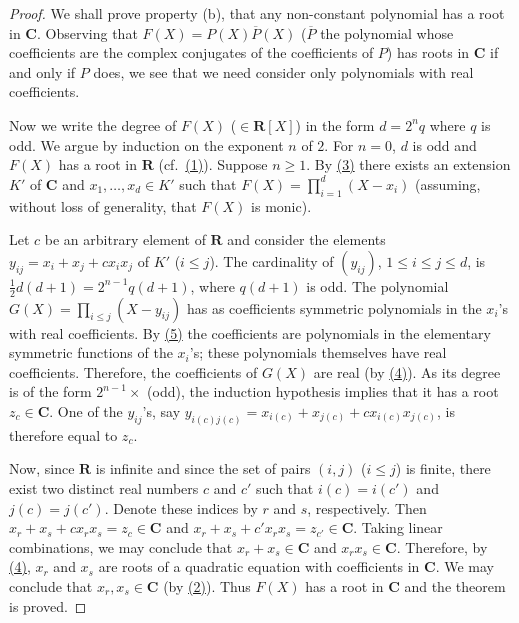 \begin{proof}
We shall prove property (b), that any non-constant polynomial has a root in
$\mathbf{C}$. Observing that
$F(X)=P(X)\overline{P}(X)$ ($\overline{P}$ the polynomial whose
coefficients are the complex conjugates of the coefficients of $P$) has
roots in $\mathbf{C}$ if and only if $P$ does, we see that we need consider
only polynomials with real coefficients.

Now we write the degree of $F(X)$ ($\in\mathbf{R}[X]$) in the form
$d=2^{n}q$ where $q$ is odd. We argue by induction on the exponent $n$ of
$2$. For $n=0$, $d$ is odd and $F(X)$ has a root in $\mathbf{R}$ (cf.\ \hyperref[fact:II.A.1]{(1)}).
Suppose $n\geq1$. By \hyperref[fact:II.A.3]{(3)} there exists an extension $K'$ of $\mathbf{C}$ and
$x_{1},\ldots,x_{d}\in K'$ such that
$F(X)=\prod_{i=1}^{d}(X-x_{i})$ (assuming, without loss of generality, that
$F(X)$ is monic).

Let $c$ be an arbitrary element of $\mathbf{R}$ and consider the elements
$y_{ij}=x_{i}+x_{j}+cx_{i}x_{j}$ of $K'$ ($i\leq j$). The cardinality of
$(y_{ij})$, $1\leq i\leq j\leq d$, is
$\frac{1}{2}d(d+1)=2^{n-1}q(d+1)$, where $q(d+1)$ is odd. The polynomial
$G(X)=\prod_{i\leq j}(X-y_{ij})$ has as coefficients symmetric polynomials
in the $x_{i}$'s with real coefficients. By \hyperref[fact:II.A.5]{(5)} the coefficients are
polynomials in the elementary symmetric functions of the $x_{i}$'s; these
polynomials themselves have real coefficients. Therefore, the coefficients
of $G(X)$ are real (by \hyperref[fact:II.A.4]{(4)}). As its degree is of the form $2^{n-1}\times$
(odd), the induction hypothesis implies that it has a root
$z_{c}\in\mathbf{C}$. One of the $y_{ij}$'s, say
$y_{i(c)j(c)}=x_{i(c)}+x_{j(c)}+cx_{i(c)}x_{j(c)}$, is therefore equal to
$z_{c}$.

Now, since $\mathbf{R}$ is infinite and since the set of pairs $(i,j)$
($i\leq j$) is finite, there exist two distinct real numbers $c$ and $c'$
such that $i(c)=i(c')$ and $j(c)=j(c')$. Denote these indices by $r$ and
$s$, respectively. Then
$x_{r}+x_{s}+cx_{r}x_{s}=z_{c}\in\mathbf{C}$ and
$x_{r}+x_{s}+c'x_{r}x_{s}=z_{c'}\in\mathbf{C}$. Taking linear combinations,
we may conclude that $x_{r}+x_{s}\in\mathbf{C}$ and
$x_{r}x_{s}\in\mathbf{C}$. Therefore, by \hyperref[fact:II.A.4]{(4)}, $x_{r}$ and $x_{s}$ are roots
of a quadratic equation with coefficients in $\mathbf{C}$. We may conclude
that $x_{r},x_{s}\in\mathbf{C}$ (by \hyperref[fact:II.A.2]{(2)}). Thus $F(X)$ has a root in
$\mathbf{C}$ and the theorem is proved.
\end{proof}
